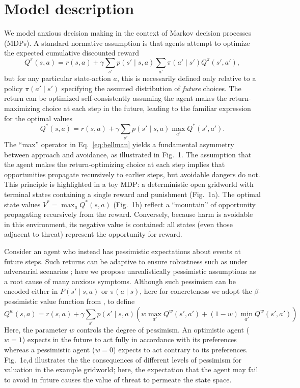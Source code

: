 \documentclass[11pt]{article} %
\begin{document}
\section{Model description}

We model anxious decision making in the context of Markov decision processes (MDPs). A standard normative assumption is that agents attempt to optimize the expected cumulative discounted reward
\begin{equation*}
Q^\pi(s,a) = r(s,a) + \gamma \sum_{s'} p(s' \mid s,a) \sum_{a'} \pi(a' \mid s') Q^\pi(s',a'),
\end{equation*}
but for any particular state-action $a$, this is necessarily defined only relative to a policy $\pi(a' \mid s')$ specifying the assumed distribution of \emph{future} choices. The return can be optimized self-consistently assuming the agent makes the return-maximizing choice at each step in the future, leading to the familiar expression for the optimal values
\begin{equation}\label{eq:bellman}
 Q^*(s,a) = r(s,a) + \gamma \sum_{s'} p(s' \mid s,a) \max_{a'} Q^*(s',a').
\end{equation}
The ``max'' operator in Eq.~\ref{eq:bellman} yields a fundamental asymmetry between approach and avoidance, as illustrated in Fig.~1. The assumption that the agent makes the return-optimizing choice at each step implies that opportunities propagate recursively to earlier steps, but avoidable dangers do not. This principle is highlighted in a toy MDP: a deterministic open gridworld with terminal states containing a single reward and punishment (Fig.~1a). The optimal state values $V^* = \max_a Q^*(s,a)$ (Fig.~1b) reflect a ``mountain'' of opportunity propagating recursively from the reward. Conversely, because harm is avoidable in this environment, its negative value is contained: all states (even those adjacent to threat) represent the opportunity for reward.

Consider an agent who instead has pessimistic expectations about events at future steps. Such returns can be adaptive to ensure robustness such as under adversarial scenarios \cite{Garcia2015}; here we propose unrealistically pessimistic assumptions as a root cause of many anxious symptoms. Although such pessimism can be encoded either in $P(s' \mid s,a)$ or $\pi(a \mid s)$, here for concreteness we adopt the $\beta$-pessimistic value function from \cite{Gaskett2003}, to define
\begin{equation*}
Q^w(s,a) = r(s,a) + \gamma \sum_{s'} p(s' \mid s,a) \left( w \max_{a'} Q^w(s',a') + (1 - w) \min_{a'} Q^w(s',a') \right)
\end{equation*}
Here, the parameter $w$ controls the degree of pessimism. An optimistic agent ($w = 1$) expects in the future to act fully in accordance with its preferences whereas a pessimistic agent ($w = 0$) expects to act contrary to its preferences. Fig.~1c,d illustrates the the consequences of different levels of pessimism for valuation in the example gridworld; here, the expectation that the agent may fail to avoid in future causes the value of threat to permeate the state space.
\end{document}
